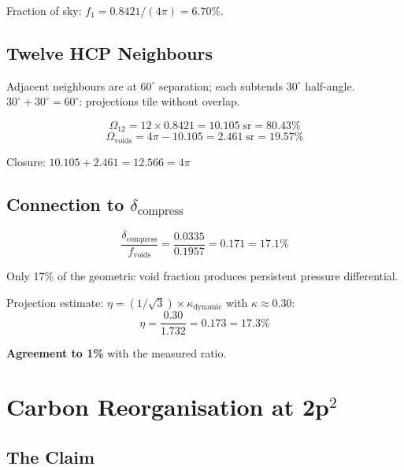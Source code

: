 Fraction of sky: $f_1 = 0.8421/(4\pi) = 6.70\%$.

\subsection{Twelve HCP Neighbours}

Adjacent neighbours are at $60^\circ$ separation; each subtends $30^\circ$ half-angle.  $30^\circ + 30^\circ = 60^\circ$: projections tile without overlap.

\begin{equation}
  \Omega_{12} = 12 \times 0.8421 = 10.105\;\text{sr} = 80.43\%
\end{equation}
\begin{equation}
  \Omega_{\text{voids}} = 4\pi - 10.105 = 2.461\;\text{sr} = 19.57\%
\end{equation}

Closure: $10.105 + 2.461 = 12.566 = 4\pi$ \checkmark

\subsection{Connection to $\delta_{\text{compress}}$}

\begin{equation}
  \frac{\delta_{\text{compress}}}{f_{\text{voids}}} = \frac{0.0335}{0.1957} = 0.171 = 17.1\%
\end{equation}

Only 17\% of the geometric void fraction produces persistent pressure differential.

Projection estimate: $\eta = (1/\sqrt{3}) \times \kappa_{\text{dynamic}}$ with $\kappa \approx 0.30$:
\begin{equation}
  \eta = \frac{0.30}{1.732} = 0.173 = 17.3\%
\end{equation}

\textbf{Agreement to 1\%} with the measured ratio.


\section{Carbon Reorganisation at 2p$^2$}

\subsection{The Claim}

